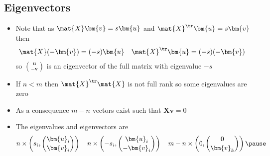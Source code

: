 \begin{slide}
\section[-1]{Eigenvectors}

\begin{PauseHighLight}
  \begin{itemize}
  \item Note that as $\mat{X} \bm{v} = s \bm{u}$ and $\mat{X}^\tr
    \bm{u} = s \bm{v}$ then
    \begin{align*}
      \mat{X} (-\bm{v}) &= (-s) \bm{u}& 
      \mat{X}^\tr \bm{u} &= (-s) (-\bm{v})
    \end{align*}
    so $\binom{\bm{u}}{-\bm{v}}$ is an eigenvector of the full matrix
    with eigenvalue $-s$\pause
  \item If $n<m$ then $\mat{X}^\tr\mat{X}$ is not full rank so some
    eigenvalues are zero\pause
  \item As a consequence $m-n$ vectors exist such that
    $\bm{X}\bm{v}=0$\pause
  \item The eigenvalues and eigenvectors are
    \begin{align*}
      n\times\left(s_i, \binom{\bm{u}_i}{\bm{v}_i}\right) \quad
      n\times\left(-s_i, \binom{\bm{u}_i}{-\bm{v}_i}\right) \quad
      m-n\times\left(0, \binom{0}{\bm{v}_k}\right) \pause
    \end{align*}
  \end{itemize}
\end{PauseHighLight}

\end{slide}


